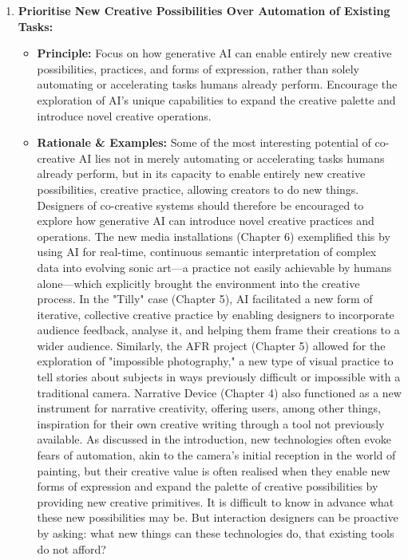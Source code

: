 \begin{enumerate}[label=\arabic*., wide, labelindent=0pt]
\item \textbf{Prioritise New Creative Possibilities Over Automation of Existing Tasks:}
    \begin{itemize}[label=\textbullet, leftmargin=*]
        \item \textbf{Principle:} Focus on how generative AI can enable entirely new creative possibilities, practices, and forms of expression, rather than solely automating or accelerating tasks humans already perform. Encourage the exploration of AI's unique capabilities to expand the creative palette and introduce novel creative operations.
        \item \textbf{Rationale \& Examples:} Some of the most interesting potential of co-creative AI lies not in merely automating or accelerating tasks humans already perform, but in its capacity to enable entirely new creative possibilities, creative practice, allowing creators to do new things. Designers of co-creative systems should therefore be encouraged to explore how generative AI can introduce novel creative practices and operations. The new media installations (Chapter 6) exemplified this by using AI for real-time, continuous semantic interpretation of complex data into evolving sonic art—a practice not easily achievable by humans alone—which explicitly brought the environment into the creative process. In the "Tilly" case (Chapter 5), AI facilitated a new form of iterative, collective creative practice by enabling designers to incorporate audience feedback, analyse it, and helping them frame their creations to a wider audience. Similarly, the AFR project (Chapter 5) allowed for the exploration of "impossible photography," a new type of visual practice to tell stories about subjects in ways previously difficult or impossible with a traditional camera. Narrative Device (Chapter 4) also functioned as a new instrument for narrative creativity, offering users, among other things, inspiration for their own creative writing through a tool not previously available. As discussed in the introduction, new technologies often evoke fears of automation, akin to the camera's initial reception in the world of painting, but their creative value is often realised when they enable new forms of expression and expand the palette of creative possibilities by providing new creative primitives. It is difficult to know in advance what these new possibilities may be. But interaction designers can be proactive by asking: what new things can these technologies do, that existing tools do not afford?
    \end{itemize}


\end{enumerate}

